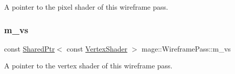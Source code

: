A pointer to the pixel shader of this wireframe pass. \hypertarget{classmage_1_1_wireframe_pass_aa55de3b804055362812bcf775e0dffb4}{}\label{classmage_1_1_wireframe_pass_aa55de3b804055362812bcf775e0dffb4} 
\subsubsection{\texorpdfstring{m\+\_\+vs}{m\_vs}}
{\footnotesize\ttfamily const \hyperlink{namespacemage_a1e01ae66713838a7a67d30e44c67703e}{Shared\+Ptr}$<$ const \hyperlink{classmage_1_1_vertex_shader}{Vertex\+Shader} $>$ mage\+::\+Wireframe\+Pass\+::m\+\_\+vs\hspace{0.3cm}{\ttfamily [private]}}

A pointer to the vertex shader of this wireframe pass. 